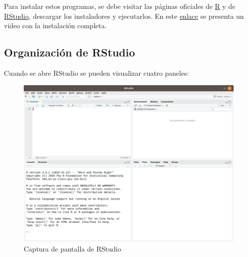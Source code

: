 \documentclass[
]{book}
\begin{document}
Para instalar estos programas, se debe visitar las páginas oficiales de \href{https://www.r-project.org/}{R} y de \href{https://www.rstudio.org/}{RStudio}, descargar los instaladores y ejecutarlos. En este \href{https://www.youtube.com/watch?v=D9Bp11iZssc}{enlace} se presenta un video con la instalación completa.

\hypertarget{organizaciuxf3n-de-rstudio}{%
\subsection{Organización de RStudio}\label{organizaciuxf3n-de-rstudio}}

Cuando se abre RStudio se pueden visualizar cuatro paneles:

\begin{figure}

{\centering \includegraphics[width=1\linewidth]{images/intro/12_AbrirRStudio} 

}

\caption{Captura de pantalla de RStudio}\label{fig:unnamed-chunk-10}
\end{figure}
\end{document}
